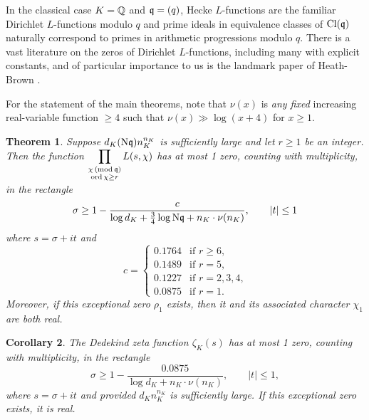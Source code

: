\documentclass[12pt,psamsfonts]{amsart}
\newtheorem{thm}{Theorem}[section]
\newtheorem{cor}[thm]{Corollary}
\theoremstyle{definition}
\theoremstyle{remark}
\numberwithin{equation}{section}
\begin{document}
In the classical case $K = \mathbb{Q}$ and $\mathfrak{q} = (q)$, Hecke $L$-functions are the familiar Dirichlet $L$-functions modulo $q$ and prime ideals in equivalence classes of $\mathrm{Cl}(\mathfrak{q})$ naturally correspond to primes in arithmetic progressions modulo $q$. There is a vast literature on the zeros of Dirichlet $L$-functions, including many with explicit constants, and of particular importance to us is the landmark paper of Heath-Brown \cite{HBLinnik}.


For the statement of the main theorems, note that $\nu(x)$ is \emph{any fixed} increasing real-variable function $\geq 4$ such that $\nu(x) \gg \log(x+4)$ for $x \geq 1$.

\begin{thm} \label{MainTheorem-ZFR}  Suppose $d_K (\mathrm{N}\mathfrak{q}) n_K^{n_K}$ is sufficiently large and let $r \geq 1$ be an integer. 
Then the function $\displaystyle \prod_{\substack{ \chi \, (\mathrm{mod} {\, \mathfrak{q}}) \\ \mathrm{ord}\, \chi \geq r} } L(s,\chi)$ has at most 1 zero, counting with multiplicity, in the rectangle
\[
\sigma \geq 1 - \frac{c}{\log d_K + \tfrac{3}{4}\log \mathrm{N}\mathfrak{q} + n_K \cdot \nu(n_K)}, \qquad |t| \leq 1
\]
where $s = \sigma+it$ and
\[
c = 
\begin{cases}
0.1764 & \text{if $r \geq 6$,} \\
0.1489 & \text{if $r = 5$,}  \\
0.1227 & \text{if $r = 2, 3, 4$,} \\
0.0875 & \text{if $r= 1$.}
\end{cases}
\]
Moreover, if this exceptional zero $\rho_1$ exists, then it and its associated character $\chi_1$ are both real. 
\end{thm}

\begin{cor} \label{Corollary-ZFR}
The Dedekind zeta function $\zeta_K(s)$ has at most 1 zero, counting with multiplicity, in the rectangle
\[
\sigma \geq 1 - \frac{0.0875}{\log d_K + n_K \cdot \nu(n_K)}, \qquad |t| \leq 1,
\]
where $s = \sigma+it$ and provided $d_K n_K^{n_K}$ is sufficiently large. If this exceptional zero exists, it is real. 
\end{cor}
\end{document}
